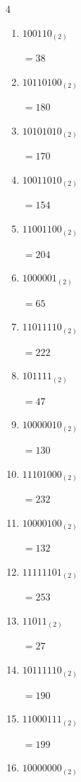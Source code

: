 \begin{multicols}{4}
\begin{enumerate}
        $=238$

  \item $100110_{(2)}$

        $=38$

  \item $10110100_{(2)}$

        $=180$

  \item $10101010_{(2)}$

        $=170$

  \item $10011010_{(2)}$

        $=154$

  \item $11001100_{(2)}$

        $=204$

  \item $1000001_{(2)}$

        $=65$

  \item $11011110_{(2)}$

        $=222$

  \item $101111_{(2)}$

        $=47$

  \item $10000010_{(2)}$

        $=130$

  \item $11101000_{(2)}$

        $=232$

\columnbreak %

  \item $10000100_{(2)}$

        $=132$

  \item $11111101_{(2)}$

        $=253$

  \item $11011_{(2)}$

        $=27$

  \item $10111110_{(2)}$

        $=190$

  \item $11000111_{(2)}$

        $=199$

  \item $10000000_{(2)}$


\end{enumerate}
\end{multicols}
